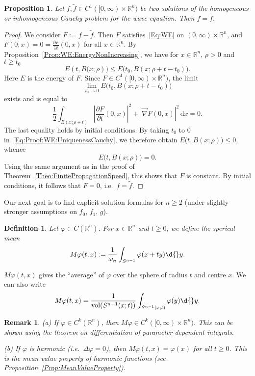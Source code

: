 \documentclass[12pt, oneside, a4paper]{article}
\newtheorem{prop}[thm]{Proposition}
\def\grad{\operatorname{grad}}
\def\vol{\operatorname{vol}}
\theoremstyle{dfn}
\newtheorem{dfn}[thm]{Definition}
\newtheorem{rem}[thm]{Remark}
\def \grad {\overrightarrow{\nabla}}
\def\Rbb{\ensuremath{\mathbb{R}}}
\def\dx{\,\mathrm dx}
\providecommand{\Abs}[1]{\left\lvert#1\right\rvert}
\begin{document}
\begin{prop}
Let $f, \widetilde{f} \in C^1([0,\infty) \times \Rbb^n)$ be two solutions of the homogeneous or inhomogeneous Cauchy problem for the wave equation. Then $f = \widetilde{f}$.
\end{prop}

\begin{proof}
We consider $F:= f - \widetilde{f}$. Then $F$ satisfies~\eqref{Eq:WE} on $(0,\infty) \times \Rbb^n$, and $F(0,x) = 0 = \frac{\partial F}{\partial t}(0,x)$ for all $x \in \Rbb^n$. By Proposition~\ref{Prop:WE:EnergyNonIncreasing}, we have for $x \in \Rbb^n$, $\rho > 0$ and $t \geqslant t_0$
\begin{equation}\label{Eq:Proof:WE:UniquenessCauchy}
E(t, B\big(x;\rho)\big) \leqslant E \big(t_0, B(x; \rho + t - t_0) \big).
\end{equation}
Here $E$ is the energy of $F$. Since $F \in C^1([0,\infty) \times \Rbb^n)$, the limit
\[
\lim_{t_0 \to 0} E \big( t_0, B(x; \rho + t - t_0) \big)
\]
exists and is equal to
\[
\frac{1}{2} \int_{B(x; \rho + t)} \Abs{ \frac{\partial F}{\partial t}(0,x) }^2 + \Abs{\grad F(0,x)}^2 \dx
= 0.
\]
The last equality holds by initial conditions. By taking $t_0$ to $0$ in~\eqref{Eq:Proof:WE:UniquenessCauchy}, we therefore obtain $E \big( t, B(x;\rho) \big) \leqslant 0$, whence
\[
E \big( t, B(x;\rho) \big) = 0.
\]
Using the same argument as in the proof of Theorem~\ref{Theo:FinitePropagationSpeed}, this shows that $F$ is constant. By initial conditions, it follows that $F = 0$, i.e.\ $f = \widetilde{f}$.
\end{proof}

Our next goal is to find explicit solution formulas for $n \geqslant 2$ (under slightly stronger assumptions on $f_0$, $f_1$, $g$).

\begin{dfn}\label{Def:SphericalMean}
Let $\varphi \in C(\Rbb^n)$. For $x \in \Rbb^n$ and $t \geqslant 0$, we define the sperical mean
\[
M\varphi(t,x) := \frac{1}{\omega_n} \int_{S^{n-1}} \varphi(x + ty) \d{}y.
\]
\end{dfn}

$M \varphi(t,x)$ gives the ``average'' of $\varphi$ over the sphere of radius $t$ and centre $x$. We can also write
\[
M\varphi(t,x) = \frac{1}{\vol(S^{n-1}(x;t))} \int_{S^{n-1}(x;t)} \varphi(y) \d{}y.
\]

\begin{rem}
(a) If $\varphi \in C^k(\Rbb^n)$, then $M\varphi \in C^k([0,\infty) \times \Rbb^n)$. This can be shown using the theorem on differentiation of parameter-dependent integrals.

(b) If $\varphi$ is harmonic (i.e.\ $\Delta \varphi = 0$), then $M\varphi(t,x) = \varphi(x)$ for all $t \geqslant 0$. This is the mean value property of harmonic functions (see Proposition~\ref{Prop:MeanValueProperty}).
\end{rem}
\end{document}

